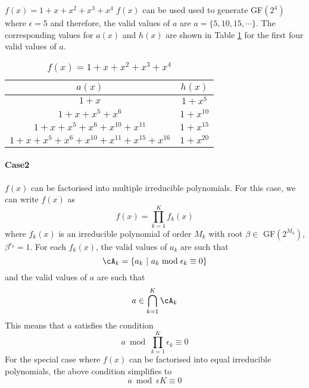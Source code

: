 \begin{example}
$f(x)=1+x+x^2+x^3+x^4$\newline
$f(x)$ can be used used to generate GF$(2^4)$ where $\epsilon=5$ and therefore, the valid values of $a$ are $a=\{5,10,15,\cdots\}$. The corresponding values for $a(x)$ and $h(x)$ are shown in Table \ref{novelTab3} for the first four valid values of $a$.

\begin{table}[htbp]
\caption{$f(x)=1+x+x^2+x^3+x^4$}
\centering
\begin{tabular}{c c} 
 \hline
 $a(x)$ & $h(x)$  \\ [0.5ex] 
 \hline\hline
$1+x$ &$1+x^5$\\ 
$1+x+x^5+x^6$ &$1+x^{10}$  \\
$1+x+x^5+x^6+x^{10}+x^{11}$ & $1+x^{15}$ \\
$1+x+x^5+x^6+x^{10}+x^{11}+x^{15}+x^{16}$ &$1+x^{20}$  
 \end{tabular}
 \label{novelTab3}
\end{table}
\end{example}


\paragraph{Case2}$f(x)$ can be factorised into multiple irreducible polynomials. \newline
For this case, we can write $f(x)$ as $$f(x)=\prod_{k=1}^{K}f_k(x)$$ where $f_k(x)$ is an irreducible polynomial of order $M_k$ with root $\beta \in $ GF$(2^{M_k})$, $\beta^{\epsilon_k}=1$. 
For each $f_k(x)$, the valid values of  $a_k$ are such that 
$$ \cA_k=\{a_k~ |~ a_k \bmod \epsilon_k \equiv 0\}$$ and the valid values of $a$ are such that
$$a \in  \bigcap_{k=1}^{K} \cA_k$$
This means that $a$ satisfies the condition
$$ a \bmod  \prod_{k=1}^{K} \epsilon_k \equiv 0$$
For the special case where $f(x)$ can be factorised into equal irreducible polynomials, the above condition simplifies to 
$$a \bmod \epsilon K \equiv 0$$

